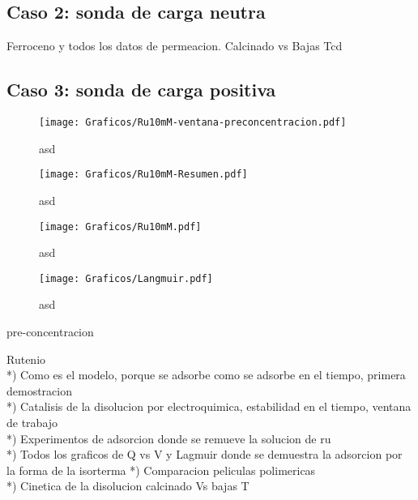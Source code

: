 	\subsection{Caso 2: sonda de carga neutra}

	Ferroceno y todos los datos de permeacion. Calcinado vs Bajas Tcd 

	\subsection{Caso 3: sonda de carga positiva}

			\begin{figure}[ht]
				\centering
		 	    \texttt{[image: Graficos/Ru10mM-ventana-preconcentracion.pdf]}
		        \caption[asd]{asd}
		        \label{fig:asd}
		      	\end{figure}

			\begin{figure}[ht]
				\centering
		 	    \texttt{[image: Graficos/Ru10mM-Resumen.pdf]}
		        \caption[asd]{asd}
		        \label{fig:asd}
		      	\end{figure}
		    
			\begin{figure}[ht]
				\centering
		 	    \texttt{[image: Graficos/Ru10mM.pdf]}
		        \caption[asd]{asd}
		        \label{fig:asd}
		      	\end{figure}

		    \begin{figure}[ht]
				\centering
		 	    \texttt{[image: Graficos/Langmuir.pdf]}
		        \caption[asd]{asd}
		        \label{fig:asd}
		      	\end{figure} 	
		      	      	      	
	pre-concentracion

	Rutenio\\
	*) Como es el modelo, porque se adsorbe como se adsorbe en el tiempo, primera demostracion\\
	*) Catalisis de la disolucion por electroquimica, estabilidad en el tiempo, ventana de trabajo\\
	*) Experimentos de adsorcion donde se remueve la solucion de ru\\
	*) Todos los graficos de Q vs V y Lagmuir donde se demuestra la adsorcion por la forma de la isorterma 
	*) Comparacion peliculas polimericas\\
	*) Cinetica de la disolucion calcinado Vs bajas T

